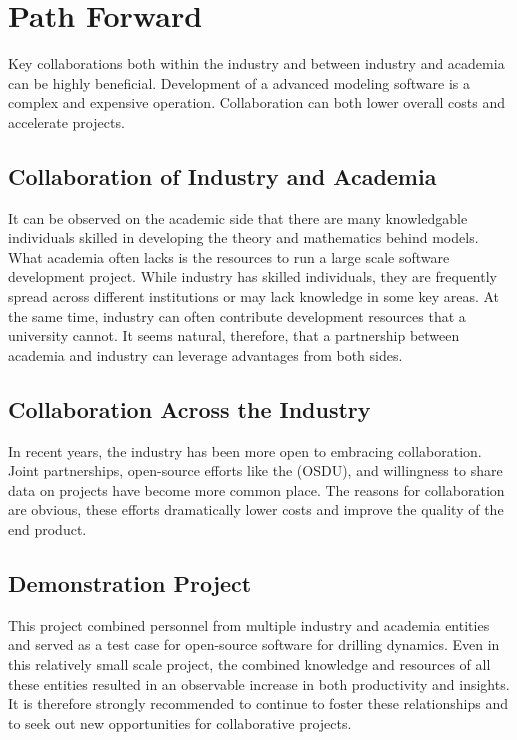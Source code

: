\section{Path Forward}
Key collaborations both within the industry and between industry and academia can be highly beneficial.  Development of a advanced modeling software is a complex and expensive operation.  Collaboration can both lower overall costs and accelerate projects.

\subsection{Collaboration of Industry and Academia}
It can be observed on the academic side that there are many knowledgable individuals skilled in developing the theory and mathematics behind models.  What academia often lacks is the resources to run a large scale software development project.  While industry has skilled individuals, they are frequently spread across different institutions or may lack knowledge in some key areas.  At the same time, industry can often contribute development resources that a university cannot.  It seems natural, therefore, that a partnership between academia and industry can leverage advantages from both sides.

\subsection{Collaboration Across the Industry}
In recent years, the industry has been more open to embracing collaboration.  Joint partnerships, open-source efforts like the \osdu{} (OSDU), and willingness to share data on projects have become more common place.  The reasons for collaboration are obvious, these efforts dramatically lower costs and improve the quality of the end product.

\subsection{Demonstration Project}
This project combined personnel from multiple industry and academia entities and served as a test case for open-source software for drilling dynamics.  Even in this relatively small scale project, the combined knowledge and resources of all these entities resulted in an observable increase in both productivity and insights.  It is therefore strongly recommended to continue to foster these relationships and to seek out new opportunities for collaborative projects.


